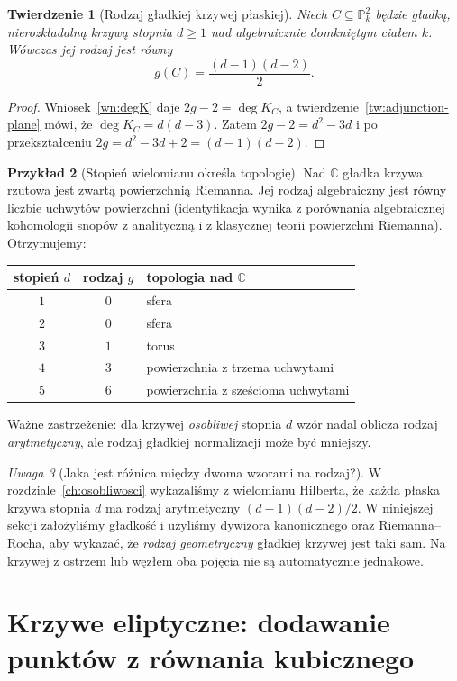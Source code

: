 \documentclass[11pt,a4paper,openany]{report}
\numberwithin{equation}{section}
\theoremstyle{plain}
\newtheorem{twierdzenie}{Twierdzenie}[section]
\theoremstyle{definition}
\newtheorem{przyklad}[twierdzenie]{Przykład}
\theoremstyle{remark}
\newtheorem{uwaga}[twierdzenie]{Uwaga}
\newcommand{\C}{\mathbb C}
\newcommand{\PP}{\mathbb P}
\begin{document}
\begin{twierdzenie}[Rodzaj gładkiej krzywej płaskiej]
\label{tw:plane-genus}
Niech $C\subseteq\PP^2_k$ będzie gładką,
nierozkładalną krzywą stopnia $d\ge1$
nad algebraicznie domkniętym ciałem $k$.
Wówczas jej rodzaj jest równy
\[
 g(C)=\frac{(d-1)(d-2)}2.
\]
\end{twierdzenie}
\begin{proof}
Wniosek~\ref{wn:degK} daje $2g-2=\deg K_C$,
a twierdzenie~\ref{tw:adjunction-plane} mówi,
że $\deg K_C=d(d-3)$. Zatem
$2g-2=d^2-3d$ i po przekształceniu
$2g=d^2-3d+2=(d-1)(d-2)$.
\end{proof}

\begin{przyklad}[Stopień wielomianu określa topologię]
Nad $\C$ gładka krzywa rzutowa jest zwartą
powierzchnią Riemanna. Jej rodzaj algebraiczny
jest równy liczbie uchwytów powierzchni
(identyfikacja wynika z porównania algebraicznej
kohomologii snopów z analityczną i z klasycznej
teorii powierzchni Riemanna). Otrzymujemy:
\begin{center}
\begin{tabular}{c|c|l}
stopień $d$&rodzaj $g$&topologia nad $\C$\\\hline
$1$&$0$&sfera\\
$2$&$0$&sfera\\
$3$&$1$&torus\\
$4$&$3$&powierzchnia z trzema uchwytami\\
$5$&$6$&powierzchnia z sześcioma uchwytami
\end{tabular}
\end{center}
Ważne zastrzeżenie: dla krzywej \emph{osobliwej}
stopnia $d$ wzór nadal oblicza rodzaj \emph{arytmetyczny},
ale rodzaj gładkiej normalizacji może być mniejszy.
\end{przyklad}

\begin{uwaga}[Jaka jest różnica między dwoma wzorami na rodzaj?]
W rozdziale~\ref{ch:osobliwosci} wykazaliśmy z
wielomianu Hilberta, że każda płaska krzywa
stopnia $d$ ma rodzaj arytmetyczny
$(d-1)(d-2)/2$. W niniejszej sekcji założyliśmy
gładkość i użyliśmy dywizora kanonicznego oraz
Riemanna--Rocha, aby wykazać, że \emph{rodzaj
geometryczny} gładkiej krzywej jest taki sam.
Na krzywej z ostrzem lub węzłem oba pojęcia
nie są automatycznie jednakowe.
\end{uwaga}

\section{Krzywe eliptyczne: dodawanie punktów z równania kubicznego}
\label{sec:elliptic}
\end{document}
